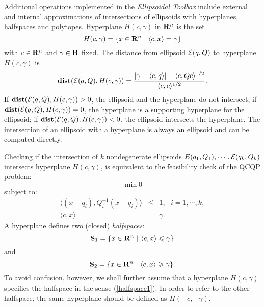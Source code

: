 Additional operations implemented in the {\it Ellipsoidal Toolbox} include
external and internal approximations of intersections of ellipsoids with
hyperplanes, halfspaces and polytopes.
\bd
Hyperplane $H(c,\gamma)$ in ${\bf R}^n$ is the set
\begin{equation}
H(c,\gamma) = \{x\in{\bf R}^n ~|~ \langle c, x\rangle = \gamma\}
\label{hyperplane}
\end{equation}
with $c\in{\bf R}^n$ and $\gamma\in{\bf R}$ fixed.
\label{hyperplanedef}
\ed
The distance from ellipsoid $\EE(q,Q)$ to hyperplane $H(c,\gamma)$ is
\begin{equation}
{\bf dist}(\EE(q,Q),H(c,\gamma)) =
\frac{\left|\gamma-\langle c,q\rangle\right| -
\langle c,Qc\rangle^{1/2}}{\langle c,c\rangle^{1/2}}. \label{dist_hp}
\end{equation}
If ${\bf dist}(\EE(q,Q),H(c,\gamma))>0$, the ellipsoid and the hyperplane
do not intersect;
if ${\bf dist}(\EE(q,Q),H(c,\gamma))=0$, the hyperplane is a supporting
hyperplane for the ellipsoid;
if ${\bf dist}(\EE(q,Q),H(c,\gamma))<0$, the ellipsoid intersects the
hyperplane.
The intersection of an ellipsoid with a hyperplane is always an ellipsoid
and can be computed directly.

Checking if the intersection of $k$ nondegenerate ellipsoids
$E(q_1,Q_1),\cdots,\EE(q_k,Q_k)$ intersects  hyperplane $H(c,\gamma)$,
is equivalent to the feasibility check of the QCQP problem:
\[ \min 0 \]
subject to:
\begin{eqnarray*}
\langle (x-q_i),Q_i^{-1}(x-q_i)\rangle & \leq & 1, ~~~ i=1,\cdots,k,\\
\langle c, x\rangle & = & \gamma .
\end{eqnarray*}
A hyperplane defines two (closed) {\it halfspaces}:
\begin{equation}
{\bf S}_1 = \{x\in{\bf R}^n ~|~ \langle c, x\rangle \leq \gamma\}
\label{halfspace1}
\end{equation}
and
\begin{equation}
{\bf S}_2 = \{x\in{\bf R}^n ~|~ \langle c, x\rangle \geq \gamma\}.
\label{halfspace2}
\end{equation}
To avoid confusion, however, we shall further assume that a
 hyperplane $H(c,\gamma)$ specifies the halfspace in the sense
(\ref{halfspace1}). In order to refer to the
other halfspace, the same hyperplane should be defined as $H(-c,-\gamma)$.

